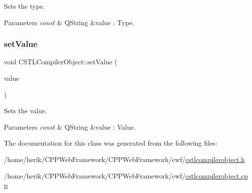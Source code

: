 Sets the type. 


\begin{DoxyParams}{Parameters}
{\em const} & Q\+String \&value \+: Type. \\
\hline
\end{DoxyParams}
\mbox{\label{class_c_s_t_l_compiler_object_ab32dd59c381d9fbf7d2ce58226c4f93a}} 
\subsubsection{\texorpdfstring{set\+Value}{setValue}}
{\footnotesize\ttfamily void C\+S\+T\+L\+Compiler\+Object\+::set\+Value (\begin{DoxyParamCaption}\item[{const Q\+String \&}]{value }\end{DoxyParamCaption})\hspace{0.3cm}{\ttfamily [slot]}}



Sets the value. 


\begin{DoxyParams}{Parameters}
{\em const} & Q\+String \&value \+: Value. \\
\hline
\end{DoxyParams}


The documentation for this class was generated from the following files\+:\begin{DoxyCompactItemize}
\item 
/home/herik/\+C\+P\+P\+Web\+Framework/\+C\+P\+P\+Web\+Framework/cwf/\hyperlink{cstlcompilerobject_8h}{cstlcompilerobject.\+h}\item 
/home/herik/\+C\+P\+P\+Web\+Framework/\+C\+P\+P\+Web\+Framework/cwf/\hyperlink{cstlcompilerobject_8cpp}{cstlcompilerobject.\+cpp}\end{DoxyCompactItemize}
